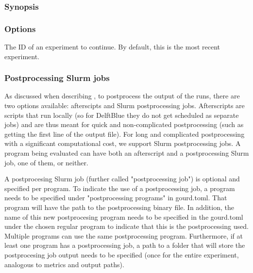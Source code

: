 \documentclass[a4paper,english]{article}
\begin{document}
\begin{adjustwidth}{18pt}{0pt}
            \subsubsection{Synopsis}
                 

            \subsubsection{Options}
                \begin{Description}[Options]
                  \item[\Arg{experiment-id}]
                    The ID of an experiment to continue.
                    By default, this is the most recent experiment.
                \end{Description}

            \subsubsection{Postprocessing Slurm jobs}
                As discussed when describing  , to postprocess the output of the runs,
                there are two options available: afterscipts and Slurm postprocessing jobs. Afterscripts are
                scripts that run locally (so for DelftBlue they do not get scheduled as separate jobs) and are
                thus meant for quick and non-complicated postprocessing (such as getting the first line of the
                output file). For long and complicated postprocessing with a significant computational cost,
                we support Slurm postprocessing jobs. A program being evaluated can have both an afterscript
                and a postprocessing Slurm job, one of them, or neither.

                A postprocesing Slurm job (further called "postprocessing job") is optional and specified per
                program. To indicate the use of a postprocessing job, a program needs to be specified under
                "postprocessing programs" in gourd.toml. That program will have the path to the postprocessing
                binary file. In addition, the name of this new postprocesing program needs to be specified in
                the gourd.toml under the chosen regular program to indicate that this is the postprocessing
                used. Multiple programs can use the same postprocessing program. Furthermore, if at least one
                program has a postprocessing job, a path to a folder that will store the postprocesing job
                output needs to be specified (once for the entire experiment, analogous to metrics and output
                paths).


\end{adjustwidth}
\end{document}

